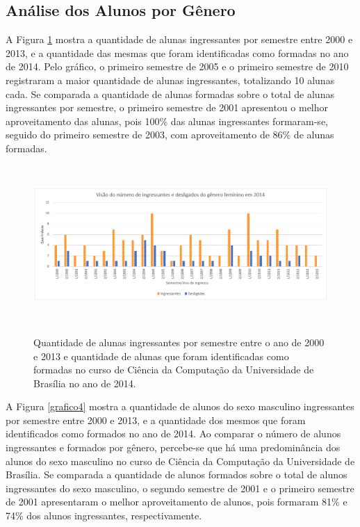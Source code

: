 \subsection{Análise dos Alunos por Gênero} \label{analise_genero}

A Figura \ref{grafico3} mostra a quantidade de alunas ingressantes por semestre entre 2000 e 2013, e a quantidade das mesmas que foram identificadas como formadas no ano de 2014. Pelo gráfico, o primeiro semestre de 2005 e o primeiro semestre de 2010 registraram a maior quantidade de alunas ingressantes, totalizando 10 alunas cada. Se comparada a quantidade de alunas formadas sobre o total de alunas ingressantes por semestre, o primeiro semestre de 2001 apresentou o melhor aproveitamento das alunas, pois 100\% das alunas ingressantes formaram-se, seguido do primeiro semestre de 2003, com aproveitamento de 86\% de alunas formadas. 
  
\begin{figure}[!h]
	\centering
	{\includegraphics[width=16cm, height=6cm]{images/grafico3}}
	\caption {Quantidade de alunas ingressantes por semestre  entre o ano de 2000 e 2013 e quantidade de alunas que foram identificadas como formadas no curso de Ciência da Computação da Universidade de Brasília no ano de 2014.}
	\label{grafico3}
\end{figure}

A Figura \ref{grafico4} mostra a quantidade de alunos do sexo masculino ingressantes por semestre entre 2000 e 2013, e a quantidade dos mesmos que foram identificados como formados no ano de 2014. Ao comparar o número de alunos ingressantes e formados por gênero, percebe-se que há uma predominância dos alunos do sexo masculino no curso de Ciência da Computação da Universidade de Brasília. Se comparada a quantidade de alunos formados sobre o total de alunos ingressantes do sexo masculino, o segundo semestre de 2001 e o primeiro semestre de 2001 apresentaram o melhor aproveitamento de alunos, pois formaram 81\% e 74\% dos alunos ingressantes, respectivamente. 

